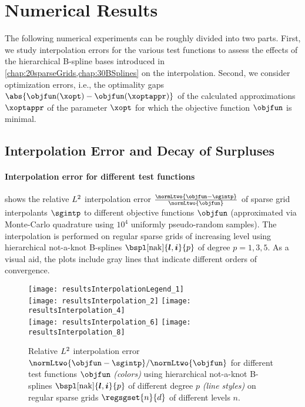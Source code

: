 \section{Numerical Results}
\label{sec:54results}

The following numerical experiments can be roughly divided into two parts.
First, we study interpolation errors for the various test functions
to assess the effects of the hierarchical B-spline bases introduced in
\cref{chap:20sparseGrids,chap:30BSplines} on the interpolation.
Second, we consider optimization errors, i.e.,
the optimality gaps $\abs{\objfun(\xopt) - \objfun(\xoptappr)}$
of the calculated approximations $\xoptappr$
of the parameter $\xopt$ for which the objective function $\objfun$
is minimal.



\subsection{Interpolation Error and Decay of Surpluses}
\label{sec:541interpolation}

\paragraph{Interpolation error for different test functions}

 shows the
relative $L^2$ interpolation error
$\tfrac{\normLtwo{\objfun - \sgintp}}{\normLtwo{\objfun}}$
of sparse grid interpolants $\sgintp$ to
different objective functions $\objfun$
(approximated via Monte-Carlo quadrature using
$10^4$ uniformly pseudo-random samples).
The interpolation is performed on regular sparse grids of increasing level
using hierarchical not-a-knot B-splines $\bspl[\nak]{\*l,\*i}{p}$
of degree $p = 1, 3, 5$.
As a visual aid, the plots include gray lines that indicate different
orders of convergence.

\begin{figure}
  \texttt{[image: resultsInterpolationLegend\_1]}\\[2mm]%
  \texttt{[image: resultsInterpolation\_2]}%
  \hfill%
  \texttt{[image: resultsInterpolation\_4]}%
  \\[2mm]%
  \texttt{[image: resultsInterpolation\_6]}%
  \hfill%
  \texttt{[image: resultsInterpolation\_8]}%
  \caption[Relative interpolation error for different test functions]{%
    Relative $L^2$ interpolation error
    $\normLtwo{\objfun - \sgintp}/\normLtwo{\objfun}$
    for different test functions $\objfun$ \emph{(colors)}
    using hierarchical not-a-knot B-splines
    $\bspl[\nak]{\*l,\*i}{p}$ of different degree $p$ \emph{(line styles)} on
    regular sparse grids $\regsgset{n}{d}$ of different levels $n$.%
  }%
  \label{fig:resultsInterpolationErrorTestFunctions}%
\end{figure}

